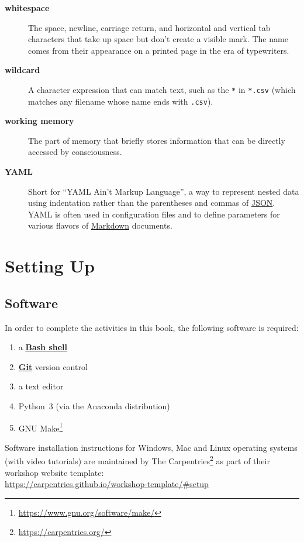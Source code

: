 \documentclass[
]{krantz}
\providecommand{\tightlist}{%
  \setlength{\itemsep}{0pt}\setlength{\parskip}{0pt}}
\renewcommand{\href}[2]{#2\footnote{\url{#1}}}
\newcommand{\gref}[2]{\hyperlink{#2}{\textbf{#1}}}
\begin{document}
\begin{description}
\item[\textbf{whitespace}]
The space, newline, carriage return, and horizontal and vertical tab characters that take up space but don't create a visible mark. The name comes from their appearance on a printed page in the era of typewriters.
\item[\textbf{wildcard}]
A character expression that can match text, such as the \texttt{*} in \texttt{*.csv} (which matches any filename whose name ends with \texttt{.csv}).
\item[\textbf{working memory}]
The part of memory that briefly stores information that can be directly accessed by consciousness.
\item[\textbf{YAML}]
Short for ``YAML Ain't Markup Language'', a way to represent nested data using indentation rather than the parentheses and commas of \protect\hyperlink{json}{JSON}. YAML is often used in configuration files and to define parameters for various flavors of \protect\hyperlink{markdown}{Markdown} documents.
\end{description}

\hypertarget{install}{%
\chapter{Setting Up}\label{install}}

\hypertarget{install-software}{%
\section{Software}\label{install-software}}

In order to complete the activities in this book,
the following software is required:

\begin{enumerate}
\def\labelenumi{\arabic{enumi}.}
\tightlist
\item
  a \gref{Bash shell}{shell}
\item
  \gref{Git}{git} version control
\item
  a text editor
\item
  Python~3 (via the Anaconda distribution)
\item
  \href{https://www.gnu.org/software/make/}{GNU Make}
\end{enumerate}

Software installation instructions for Windows, Mac and Linux operating systems
(with video tutorials) are maintained by \href{https://carpentries.org/}{The Carpentries}
as part of their workshop website template:\\
\url{https://carpentries.github.io/workshop-template/\#setup}
\end{document}

